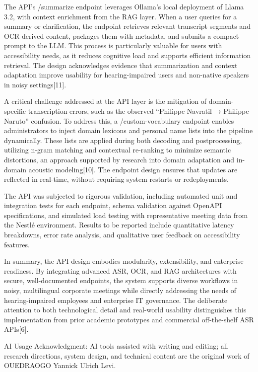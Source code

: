 \documentclass[12pt,a4paper]{article}
\begin{document}
The API’s /summarize endpoint leverages Ollama’s local deployment of Llama 3.2, with context enrichment from the RAG layer. When a user queries for a summary or clarification, the endpoint retrieves relevant transcript segments and OCR-derived content, packages them with metadata, and submits a compact prompt to the LLM. This process is particularly valuable for users with accessibility needs, as it reduces cognitive load and supports efficient information retrieval. The design acknowledges evidence that summarization and context adaptation improve usability for hearing-impaired users and non-native speakers in noisy settings[11].


A critical challenge addressed at the API layer is the mitigation of domain-specific transcription errors, such as the observed “Philippe Navratil → Philippe Naruto” confusion. To address this, a /custom-vocabulary endpoint enables administrators to inject domain lexicons and personal name lists into the pipeline dynamically. These lists are applied during both decoding and postprocessing, utilizing n-gram matching and contextual re-ranking to minimize semantic distortions, an approach supported by research into domain adaptation and in-domain acoustic modeling[10]. The endpoint design ensures that updates are reflected in real-time, without requiring system restarts or redeployments.


The API was subjected to rigorous validation, including automated unit and integration tests for each endpoint, schema validation against OpenAPI specifications, and simulated load testing with representative meeting data from the Nestlé environment. Results to be reported include quantitative latency breakdowns, error rate analysis, and qualitative user feedback on accessibility features.


In summary, the API design embodies modularity, extensibility, and enterprise readiness. By integrating advanced ASR, OCR, and RAG architectures with secure, well-documented endpoints, the system supports diverse workflows in noisy, multilingual corporate meetings while directly addressing the needs of hearing-impaired employees and enterprise IT governance. The deliberate attention to both technological detail and real-world usability distinguishes this implementation from prior academic prototypes and commercial off-the-shelf ASR APIs[6].


AI Usage Acknowledgment: AI tools assisted with writing and editing; all research directions, system design, and technical content are the original work of OUEDRAOGO Yannick Ulrich Levi.
\end{document}
